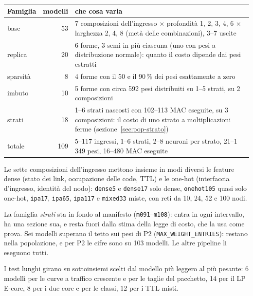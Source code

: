 \documentclass[11pt,a4paper,oneside]{report}
\begin{document}
\begin{center}
\small
\begin{tabular}{@{}lrp{8.4cm}@{}}
\toprule
\textbf{Famiglia} & \textbf{modelli} & \textbf{che cosa varia} \\
\midrule
base     & 53 & 7 composizioni dell'ingresso $\times$ profondità 1, 2, 3, 4, 6 $\times$
                larghezza 2, 4, 8 (metà delle combinazioni), 3--7 uscite \\
replica  & 20 & 6 forme, 3 semi in più ciascuna (uno con pesi a distribuzione
                normale): quanto il costo dipende dai pesi estratti \\
sparsità & 8  & 4 forme con il 50 e il 90\,\% dei pesi esattamente a zero \\
imbuto   & 10 & 5 forme con circa 592 pesi distribuiti su 1--5 strati, su 2
                composizioni \\
strati   & 18 & 1--6 strati nascosti con 102--113 MAC eseguite, su 3
                composizioni: il costo di uno strato a moltiplicazioni ferme
                (sezione~\ref{sec:pop-strato}) \\
\midrule
totale   & 109 & 5--117 ingressi, 1--6 strati, 2--8 neuroni per strato,
                21--1\,349 pesi, 16--480 MAC eseguite \\
\bottomrule
\end{tabular}
\end{center}

Le sette composizioni dell'ingresso mettono insieme in modi diversi le
feature dense (stato dei link, occupazione delle code, TTL) e le one-hot
(interfaccia d'ingresso, identità del nodo): \texttt{dense5} e
\texttt{dense17} solo dense, \texttt{onehot105} quasi solo one-hot,
\texttt{ipa17}, \texttt{ipa65}, \texttt{ipa117} e \texttt{mixed33} miste, con
reti da 10, 24, 52 e 100 nodi.

La famiglia \emph{strati} sta in fondo al manifesto (\texttt{m091}--\texttt{m108}):
entra in ogni intervallo, ha una sezione sua, e resta fuori dalla stima della
legge di costo, che la usa come prova. Sei modelli superano il tetto sui pesi di
P2 (\texttt{MAX\_WEIGHT\_ENTRIES}): restano nella popolazione, e per P2 le cifre
sono su 103 modelli. Le altre pipeline li eseguono tutti.

I test lunghi girano su sottoinsiemi scelti dal modello più leggero al più
pesante: 6 modelli per le curve a traffico crescente e per le taglie del
pacchetto, 14 per il LP E-core, 8 per i due core e per le classi, 12 per i TTL
misti.
\end{document}
